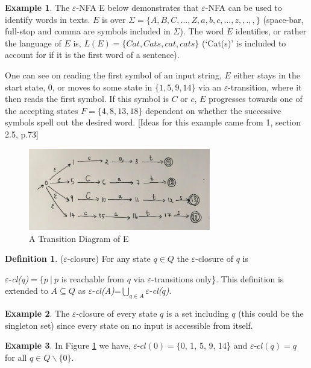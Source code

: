 \documentclass[a4paper,12pt]{report}
\theoremstyle{definition}
\newtheorem{definition}{Definition}[subsection]
\newtheorem{exmp}{Example}[subsection]
\begin{document}
\begin{exmp}
The $\varepsilon$-NFA E below demonstrates that $\varepsilon$-NFA can be used to identify words in texts. $E$ is over $\Sigma = \{A, B, C, ..., Z, a, b, c, ...,z, , . , , \}$ (space-bar, full-stop and comma are symbols included in $\Sigma$).  The word $E$ identifies, or rather the language of $E$ is, 
$L(E)=\{Cat, Cats, cat, cats\} $ (`Cat(s)' is included to account for if it is the first word of a sentence). 

One can see on reading the first symbol of an input string, $E$ either stays in the start state, 0, or moves to some state in $\{1,5,9,14\}$ via an $\varepsilon$-transition, where it then reads the first symbol.  If this symbol is $C$ or $c$, $E$ progresses towards one of the accepting states $F=\{4,8,13,18\}$ dependent on whether the successive symbols spell out the desired word.
[Ideas for this example came from 1, section 2.5, p.73]

\begin{figure}[ht]
\centering
\includegraphics[width=300px]{figure1.2.jpg}
\caption{A Transition Diagram of E}
\label{image-Figure2}
\end{figure}
\end{exmp}

\begin{definition}($\varepsilon$-closure)
For any state $q\in Q$ the $\varepsilon$-closure of $q$ is

\noindent$\varepsilon$-\textit{cl(q)}$=\{p\ |\ p$ is reachable from $q$ via $\varepsilon$-transitions only\}. This definition is extended to $A \subseteq Q$ as $\varepsilon$-\textit{cl(A)}=$\bigcup\limits_{q \in A} \varepsilon$-\textit{cl($q$)}.
\end{definition}
\noindent [4, section 2.7 p.56]

\begin{exmp}
The $\varepsilon$-closure of every state $q$ is a set including $q$ (this could be the singleton set) since every state on no input is accessible from itself.
\end{exmp}

\begin{exmp}
In Figure \ref{image-Figure2} we have, $\varepsilon$-$cl(0)=\{$0, 1, 5, 9, 14\} and $\varepsilon$-$cl(q)=q$ for all $q\in Q\backslash \{0\} $.
\end{exmp}
\end{document}
